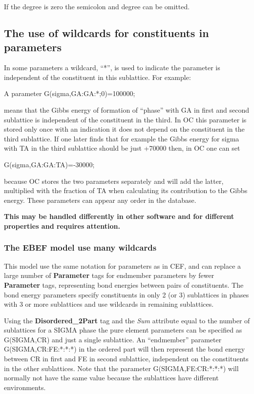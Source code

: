 \documentclass{article}
\begin{document}
If the degree is zero the semicolon and degree can be omitted.

\subsection{The use of wildcards for constituents in parameters}\label{sec:wildcard}

In some parameters a wildcard, ``*'', is used to indicate the
parameter is independent of the constituent in this sublattice.  For
example:

A parameter G(sigma,GA:GA:*;0)=100000;

\noindent
means that the Gibbs energy of formation of ``phase'' with GA in first
and second sublattice is independent of the constituent in the third.
In OC this parameter is stored only once with an indication it does
not depend on the constituent in the third sublattice.  If one later
finds that for example the Gibbs energy for sigma with TA in the third
sublattice should be just +70000 then, in OC one can set

G(sigma,GA:GA:TA)=-30000;

\noindent
because OC stores the two parameters separately and will add the
latter, multiplied with the fraction of TA when calculating its
contribution to the Gibbs energy.  These parameters can appear any
order in the database.

{\bf This may be handled differently in other software and for
  different properties and requires attention.}

\subsubsection{The EBEF model use many wildcards}\label{sec:ebef}

This model use the same notation for parameters as in CEF, and can
replace a large number of {\bf Parameter} tags for endmember
parameters by fewer {\bf Parameter} tags, representing bond energies
between pairs of constituents.  The bond energy parameters specify
constituents in only 2 (or 3) sublattices in phases with 3 or more
sublattices and use wildcards in remaining sublattices.

Using the {\bf Disordered\_2Part} tag and the {\em Sum} attribute
equal to the number of sublattices for a SIGMA phase the pure element
parameters can be specified as G(SIGMA,CR) and just a single
sublattice.  An ``endmember'' parameter G(SIGMA,CR:FE:*:*:*) in the
ordered part will then represent the bond energy between CR in first
and FE in second sublattice, independent on the constituents in the
other sublattices.  Note that the parameter G(SIGMA,FE:CR:*:*:*) will
normally not have the same value because the sublattices have
different environments.
\end{document}
